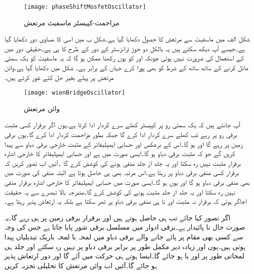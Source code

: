 \begin{figure}
\centering
\texttt{[image: phaseShiftMosfetOscillator]}
\caption{مزاحمت-کپیسٹر ماسفیٹ مرتعش}
\label{شکل_مزاحمت_کپیسٹر_ماسفیٹ_مرتعش}
\end{figure}
%
شکل  الف میں ماسفیٹ سے  مرتعش کا حصول دکھایا گیا ہے۔شکل  ب میں اسی کا مساوی دور دکھایا گیا ہے۔جیسے آپ دیکھ سکتے ہیں یہ بالکل دو جوڑ ٹرانزسٹر کے دور کے طرح کا ہی ہے۔حقیقی دور میں  کے استعمال کی ضرورت نہیں ہوتی چونکہ  اور  کو یوں رکھنا ممکن ہو گا کہ یہ ماسفیٹ کو یک سمتی مائل کرنے کے ساتھ ساتھ  کے شرط کو بھی پورا کرے جہاں  کے برابر ہے۔
شکل  میں  دکھایا گیا ہے۔وائن مرتعش پر پہلے بغیر حل کئے غور کرتے ہیں۔
\begin{figure}
\centering
\texttt{[image: wienBridgeOscillator]}
\caption{وائن مرتعش}
\label{شکل_مرتعش_وائن}
\end{figure}

آپ جانتے ہیں کہ یک سمتی رو پر کپیسٹر کھلے سرے کردار ادا کرتا ہے۔یوں اگر  برقرار کسی مثبت برقی رو پر رہے تب  کھلے سرے کردار ادا کرے گا جبکہ  بطور مزاحمت  کردار ادا کرے گا۔یوں  برقی زمین پر رہے گا اور  ہو گا۔اس کے برعکس  اور  حسابی ایمپلیفائر کے مثبت خارجی برقی دباو  سے  پیدا کریں گے جو کہ مثبت برقی دباو ہو گا۔ایسی صورت میں  ہے اور حسابی ایمپلیفائر کا خارجی اشارہ  برقرار مثبت نہیں رہ سکتا اور یہ جلد از جلد منفی ہونے کی کوشش کرے گا ۔آئیں اب تصور کریں کہ  برقرار کسی منفی برقی دباو پر رہتا ہے۔اس مرتبہ بھی  ہی حاصل ہوتا ہے البتہ منفی  کی صورت میں  بھی منفی برقی دباو ہو گا اور یوں  ہو گا۔ایسی صورت میں حسابی ایمپلیفائر  کا خارجی اشارہ برقرار منفی نہیں رہ سکتا اور یہ جلد از جلد مثبت ہونے کی کوشش کرے گا۔مندرجہ بالا تبصرے سے یہ حقیقت اجاگر ہوئی کہ  برقرار نہ مثبت اور نا ہی منفی برقی دباو پر ٹھر سکتا ہے بلکہ یہ ارتعاش پذیر رہتا ہے۔

اگر  تصور کیا جائے تب  ہی حاصل ہوتے ہیں اور  برقرار برقی زمین پر ہی رہے گا۔یہ صورت حال نا پائیدار ہے۔برقی ادوار میں مسلسل برقی شور پایا جاتا ہے جس کی وجہ سے کسی بھی مقام پر پائے جانے والے برقی دباو میں لمحہ با لمحہ باریک تبدیلیاں پیدا ہوتی ہیں۔یوں  اور  زیادہ دیر مکمل طور پر برابر برقی دباو پر نہیں رہ سکتے اور جلد ہی لمحاتی طور پر  اور یا  ہو جائے گا۔ایسا ہوتے ہی  حرکت میں آئے گا اور دور ارتعاش پذیر ہو جائے گا۔آئیں اب وائن مرتعش کا تحلیلی تجزیہ کریں

